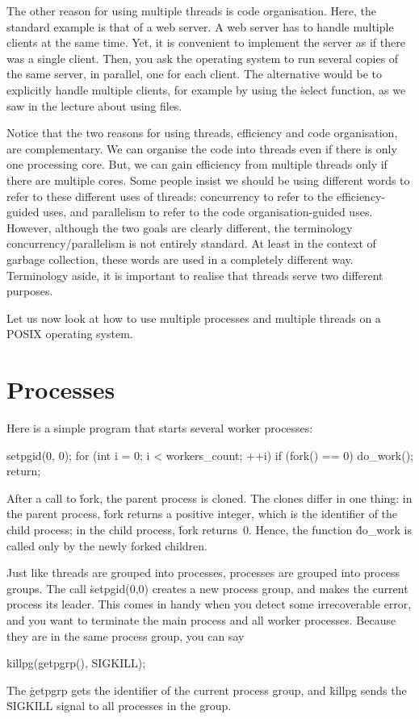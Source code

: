 The other reason for using multiple threads is code organisation.
Here, the standard example is that of a web server.
A web server has to handle multiple clients at the same time.
Yet, it is convenient to implement the server as if there was a single client.
Then, you ask the operating system to run several copies of the same server,
  in parallel, one for each client.
The alternative would be to explicitly handle multiple clients,
  for example by using the \.{select} function,
  as we saw in the lecture about using files.

Notice that the two reasons for using threads, efficiency and code organisation,
  are complementary.
We can organise the code into threads even if there is only one processing core.
But, we can gain efficiency from multiple threads only if there are multiple cores.
Some people insist we should be using different words
  to refer to these different uses of threads:
  concurrency to refer to the efficiency-guided uses,
  and parallelism to refer to the code organisation-guided uses.
However, although the two goals are clearly different,
  the terminology concurrency\slash parallelism is not entirely standard.
At least in the context of garbage collection,
  these words are used in a completely different way.
Terminology aside,
  it is important to realise that threads serve two different purposes.

Let us now look at how to use multiple processes and multiple threads
  on a POSIX operating system.

\section{Processes}

Here is a simple program that starts several worker processes:
\begin{ccode}
setpgid(0, 0);
for (int i = 0; i < workers_count; ++i) if (fork() == 0) { do_work(); return; }
\end{ccode}
After a call to \.{fork}, the parent process is cloned.
The clones differ in one thing:
  in the parent process, \.{fork} returns a positive integer,
    which is the identifier of the child process;
  in the child process, \.{fork} returns~0.
Hence, the function \.{do\_work} is called only by the newly forked children.

Just like threads are grouped into processes,
  processes are grouped into process groups.
The call \.{setpgid(0,0)} creates a new process group,
  and makes the current process its leader.
This comes in handy when you detect some irrecoverable error,
  and you want to terminate the main process and all worker processes.
Because they are in the same process group, you can say
\begin{ccode}
killpg(getpgrp(), SIGKILL);
\end{ccode}
The \.{getpgrp} gets the identifier of the current process group,
  and \.{killpg} sends the \.{SIGKILL} signal to all processes in the group.

